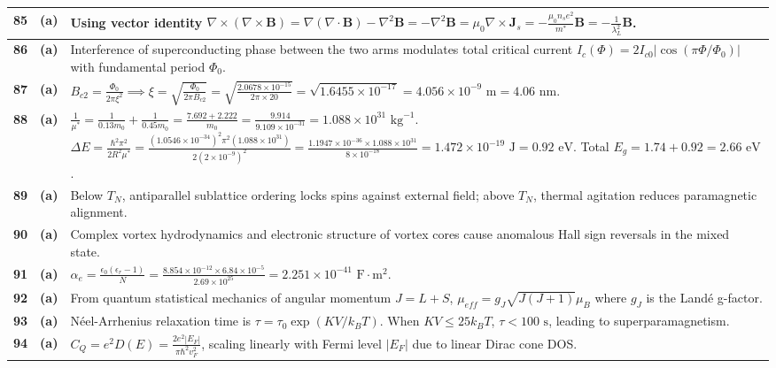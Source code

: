 {\begin{tabularx}{\textwidth}{|c|c|X|}
\textbf{85} & \textbf{(a)} & Using vector identity $\nabla \times (\nabla \times \mathbf{B}) = \nabla(\nabla \cdot \mathbf{B}) - \nabla^2 \mathbf{B} = -\nabla^2 \mathbf{B} = \mu_0 \nabla \times \mathbf{J}_s = -\frac{\mu_0 n_s e^2}{m^*} \mathbf{B} = -\frac{1}{\lambda_L^2}\mathbf{B}$. \\ \hline
\textbf{86} & \textbf{(a)} & Interference of superconducting phase between the two arms modulates total critical current $I_c(\Phi) = 2 I_{c0} |\cos(\pi \Phi / \Phi_0)|$ with fundamental period $\Phi_0$. \\ \hline
\textbf{87} & \textbf{(a)} & $B_{c2} = \frac{\Phi_0}{2\pi \xi^2} \implies \xi = \sqrt{\frac{\Phi_0}{2\pi B_{c2}}} = \sqrt{\frac{2.0678 \times 10^{-15}}{2\pi \times 20}} = \sqrt{1.6455 \times 10^{-17}} = 4.056 \times 10^{-9}\text{ m} = 4.06\text{ nm}$. \\ \hline
\textbf{88} & \textbf{(a)} & $\frac{1}{\mu^*} = \frac{1}{0.13 m_0} + \frac{1}{0.45 m_0} = \frac{7.692 + 2.222}{m_0} = \frac{9.914}{9.109 \times 10^{-31}} = 1.088 \times 10^{31}\text{ kg}^{-1}$. $\Delta E = \frac{\hbar^2 \pi^2}{2 R^2 \mu^*} = \frac{(1.0546 \times 10^{-34})^2 \pi^2 (1.088 \times 10^{31})}{2 (2 \times 10^{-9})^2} = \frac{1.1947 \times 10^{-36} \times 1.088 \times 10^{31}}{8 \times 10^{-18}} = 1.472 \times 10^{-19}\text{ J} = 0.92\text{ eV}$. Total $E_g = 1.74 + 0.92 = 2.66\text{ eV}$. \\ \hline
\textbf{89} & \textbf{(a)} & Below $T_N$, antiparallel sublattice ordering locks spins against external field; above $T_N$, thermal agitation reduces paramagnetic alignment. \\ \hline
\textbf{90} & \textbf{(a)} & Complex vortex hydrodynamics and electronic structure of vortex cores cause anomalous Hall sign reversals in the mixed state. \\ \hline
\textbf{91} & \textbf{(a)} & $\alpha_e = \frac{\epsilon_0 (\epsilon_r - 1)}{N} = \frac{8.854 \times 10^{-12} \times 6.84 \times 10^{-5}}{2.69 \times 10^{25}} = 2.251 \times 10^{-41}\text{ F}\cdot\text{m}^2$. \\ \hline
\textbf{92} & \textbf{(a)} & From quantum statistical mechanics of angular momentum $J = L + S$, $\mu_{eff} = g_J \sqrt{J(J+1)} \mu_B$ where $g_J$ is the Landé g-factor. \\ \hline
\textbf{93} & \textbf{(a)} & Néel-Arrhenius relaxation time is $\tau = \tau_0 \exp(KV / k_BT)$. When $KV \le 25 k_B T$, $\tau < 100\text{ s}$, leading to superparamagnetism. \\ \hline
\textbf{94} & \textbf{(a)} & $C_Q = e^2 D(E) = \frac{2 e^2 |E_F|}{\pi \hbar^2 v_F^2}$, scaling linearly with Fermi level $|E_F|$ due to linear Dirac cone DOS. \\ \hline

\end{tabularx}}
